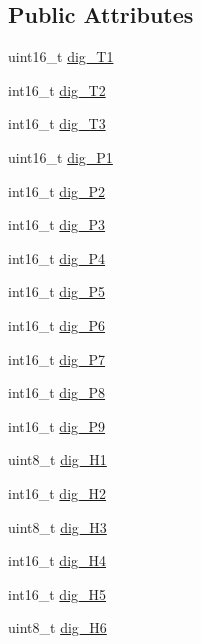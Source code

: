 \subsection*{Public Attributes}
\begin{DoxyCompactItemize}
\item 
uint16\+\_\+t \hyperlink{struct_sensor_calibration_a044a8c40e958b1cda3fb85b95303550e}{dig\+\_\+\+T1}
\item 
int16\+\_\+t \hyperlink{struct_sensor_calibration_a8f8bb62e10c9bc0decb4463128ccaee5}{dig\+\_\+\+T2}
\item 
int16\+\_\+t \hyperlink{struct_sensor_calibration_a5b134db1776888487855c6b526d130d6}{dig\+\_\+\+T3}
\item 
uint16\+\_\+t \hyperlink{struct_sensor_calibration_aba96e3c2bdbbe79c20a836d9c55c60cf}{dig\+\_\+\+P1}
\item 
int16\+\_\+t \hyperlink{struct_sensor_calibration_ab8a514b812ec77913dc95147d66bbcc4}{dig\+\_\+\+P2}
\item 
int16\+\_\+t \hyperlink{struct_sensor_calibration_ac333ef210929de18815cec04c68acec2}{dig\+\_\+\+P3}
\item 
int16\+\_\+t \hyperlink{struct_sensor_calibration_a8af2a8c6f19a2a56e784aa9a7bd49cd3}{dig\+\_\+\+P4}
\item 
int16\+\_\+t \hyperlink{struct_sensor_calibration_ae2508256bbfc0e222a677ebbd1d0acf7}{dig\+\_\+\+P5}
\item 
int16\+\_\+t \hyperlink{struct_sensor_calibration_ad1a973f775ee6d7f23d9197824971c76}{dig\+\_\+\+P6}
\item 
int16\+\_\+t \hyperlink{struct_sensor_calibration_adda4a99343f9e02de7d9f2d5949477d2}{dig\+\_\+\+P7}
\item 
int16\+\_\+t \hyperlink{struct_sensor_calibration_a06372d2918206f0cd35954e5bb35a1d2}{dig\+\_\+\+P8}
\item 
int16\+\_\+t \hyperlink{struct_sensor_calibration_a5e942a51a1b5d7753719db1e27e55c06}{dig\+\_\+\+P9}
\item 
uint8\+\_\+t \hyperlink{struct_sensor_calibration_ab8de0d58f5b0efa7ce638bed02deb460}{dig\+\_\+\+H1}
\item 
int16\+\_\+t \hyperlink{struct_sensor_calibration_afcfd149e907f83effaee0ae5dfa82a8f}{dig\+\_\+\+H2}
\item 
uint8\+\_\+t \hyperlink{struct_sensor_calibration_a65b525f9a3c58baf03db61da4626f417}{dig\+\_\+\+H3}
\item 
int16\+\_\+t \hyperlink{struct_sensor_calibration_a6b540f7bc56275b482d65e0725aeb27b}{dig\+\_\+\+H4}
\item 
int16\+\_\+t \hyperlink{struct_sensor_calibration_a03691fc56b0bff17b007ffbd71dcc7b9}{dig\+\_\+\+H5}
\item 
uint8\+\_\+t \hyperlink{struct_sensor_calibration_a2f8c842c4becfce11e04c00168a9be0f}{dig\+\_\+\+H6}
\end{DoxyCompactItemize}


